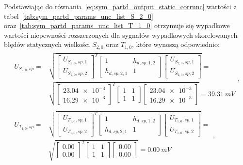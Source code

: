 Podstawiając do równania~\eqref{eq:sym_partd_output_static_corrunc} wartości z tabel~\ref{tab:sym_partd_params_unc_list_S_2_0} oraz~\ref{tab:sym_partd_params_unc_list_T_1_0} otrzymuje się wypadkowe wartości niepewności rozszerzonych dla sygnałów wypadkowych skorelowanych błędów statycznych wielkości $S_{2,0}$ oraz $T_{1,0}$, które wynoszą odpowiednio:
\begin{gather}
\begin{split}
U_{S_{2,0},sp} = & \sqrt{
\begin{bmatrix}
U_{S_{2,0},sp,1} \\ U_{S_{2,0},sp,2}
\end{bmatrix}^{T}
\begin{bmatrix}
1 & h_{d,sp,1,2} \\
h_{d,sp,2,1} & 1
\end{bmatrix}
\begin{bmatrix}
U_{S_{2,0},sp,1} \\ U_{S_{2,0},sp,2}
\end{bmatrix}} = \\ & \sqrt{
\begin{bmatrix}
\num{23.04e-3} \\ \num{16.29e-3}
\end{bmatrix}^{T}
\begin{bmatrix}
1 & 1 \\
1 & 1
\end{bmatrix}
\begin{bmatrix}
\num{23.04e-3} \\ \num{16.29e-3}
\end{bmatrix}} = \qty{39.31}{mV}
\end{split}
\label{eq:sym_partd_output_static_corrunc_S_2_0}, \\
\begin{split}
U_{T_{1,0},sp} = & \sqrt{
\begin{bmatrix}
U_{T_{1,0},sp,1} \\ U_{T_{1,0},sp,2}
\end{bmatrix}^{T}
\begin{bmatrix}
1 & h_{d,sp,1,2} \\
h_{d,sp,2,1} & 1
\end{bmatrix}
\begin{bmatrix}
U_{T_{1,0},sp,1} \\ U_{T_{1,0},sp,2}
\end{bmatrix}} = \\ & \sqrt{
\begin{bmatrix}
\num{0.00} \\ \num{0.00}
\end{bmatrix}^{T}
\begin{bmatrix}
1 & 1 \\
1 & 1
\end{bmatrix}
\begin{bmatrix}
\num{0.00} \\ \num{0.00}
\end{bmatrix}} = \qty{0.00}{mV}
\end{split}
\label{eq:sym_partd_output_static_corrunc__T_1_0},
\end{gather}
